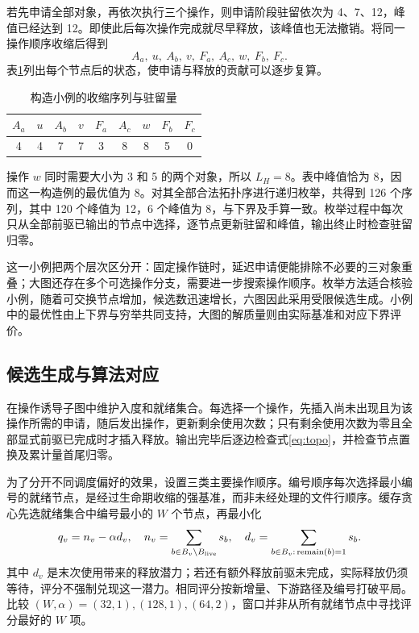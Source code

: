 若先申请全部对象，再依次执行三个操作，则申请阶段驻留依次为 4、7、12，峰值已经达到 12。即使此后每次操作完成就尽早释放，该峰值也无法撤销。将同一操作顺序收缩后得到
\begin{equation}
A_a,\ u,\ A_b,\ v,\ F_a,\ A_c,\ w,\ F_b,\ F_c.
\end{equation}
表\ref{tab:toy_life}列出每个节点后的状态，使申请与释放的贡献可以逐步复算。
\begin{table}[H]\centering\small
\caption{构造小例的收缩序列与驻留量}\label{tab:toy_life}
\begin{tabular}{ccccccccc}\toprule
$A_a$&$u$&$A_b$&$v$&$F_a$&$A_c$&$w$&$F_b$&$F_c$\\\midrule
4&4&7&7&3&8&8&5&0\\\bottomrule
\end{tabular}\end{table}

操作 $w$ 同时需要大小为 3 和 5 的两个对象，所以 $L_H=8$。表中峰值恰为 8，因而这一构造例的最优值为 8。对其全部合法拓扑序进行递归枚举，共得到 126 个序列，其中 120 个峰值为 12，6 个峰值为 8，与下界及手算一致。枚举过程中每次只从全部前驱已输出的节点中选择，逐节点更新驻留和峰值，输出终止时检查驻留归零。

这一小例把两个层次区分开：固定操作链时，延迟申请便能排除不必要的三对象重叠；大图还存在多个可选操作分支，需要进一步搜索操作顺序。枚举方法适合核验小例，随着可交换节点增加，候选数迅速增长，六图因此采用受限候选生成。小例中的最优性由上下界与穷举共同支持，大图的解质量则由实际基准和对应下界评价。

\subsection{候选生成与算法对应}
在操作诱导子图中维护入度和就绪集合。每选择一个操作，先插入尚未出现且为该操作所需的申请，随后发出操作，更新剩余使用次数；只有剩余使用次数为零且全部显式前驱已完成时才插入释放。输出完毕后逐边检查式\eqref{eq:topo}，并检查节点置换及累计量首尾归零。

为了分开不同调度偏好的效果，设置三类主要操作顺序。编号顺序每次选择最小编号的就绪节点，是经过生命期收缩的强基准，而非未经处理的文件行顺序。缓存贪心先选就绪集合中编号最小的 $W$ 个节点，再最小化
\begin{equation}
q_v=n_v-\alpha d_v,\quad
n_v=\sum_{b\in B_v\setminus B_{\rm live}}s_b,\quad
d_v=\sum_{b\in B_v:\,\operatorname{remain}(b)=1}s_b.\label{eq:greedy}
\end{equation}
其中 $d_v$ 是末次使用带来的释放潜力；若还有额外释放前驱未完成，实际释放仍须等待，评分不强制兑现这一潜力。相同评分按新增量、下游路径及编号打破平局。比较 $(W,\alpha)=(32,1),(128,1),(64,2)$，窗口并非从所有就绪节点中寻找评分最好的 $W$ 项。

